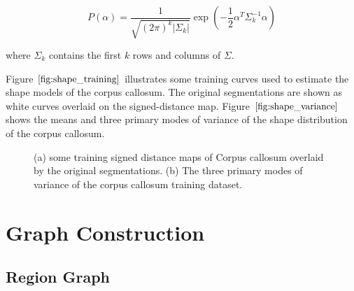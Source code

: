 \documentclass{SMBV12}
\begin{document}
\begin{equation}
P(\alpha) = \dfrac{1}{\sqrt{(2\pi)^k |\Sigma_k|}} \exp\left( -\dfrac{1}{2} \alpha^T \Sigma^{-1}_k \alpha \right) 
\end{equation}

where $\Sigma_k$ contains the first $k$ rows and columns of $\Sigma$.

Figure $\ref{fig:shape_training}$ illustrates some training curves used to estimate the shape models of the corpus callosum. The original segmentations are shown as white curves overlaid on the signed-distance map. Figure $\ref{fig:shape_variance}$ shows the means and three primary modes of variance of the shape distribution of the corpus callosum.

\begin{figure}[htbp]
    \centering
    \caption{(a) some training signed distance maps of Corpus callosum overlaid by the original segmentations. (b) The three primary modes of variance of the corpus callosum training dataset.}
\end{figure}

\section{Graph Construction}



\subsection{Region Graph}
\end{document}
